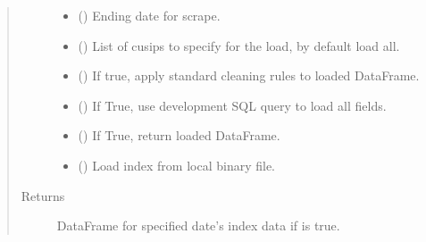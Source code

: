 \documentclass[letterpaper,10pt,english]{report}
\begin{document}
\begin{fulllineitems}
\begin{fulllineitems}
\begin{quote}
\begin{description}
\begin{itemize}
\item {} 
 (\sphinxstyleliteralemphasis{\sphinxupquote{, }}\sphinxstyleliteralemphasis{\sphinxupquote{, }}) \textendash{} Ending date for scrape.

\item {} 
 (\sphinxstyleliteralemphasis{\sphinxupquote{{[}}}\sphinxstyleliteralemphasis{\sphinxupquote{{]}}}\sphinxstyleliteralemphasis{\sphinxupquote{, }}) \textendash{} List of cusips to specify for the load, by default load all.

\item {} 
 (\sphinxstyleliteralemphasis{\sphinxupquote{, }}) \textendash{} If true, apply standard cleaning rules to loaded DataFrame.

\item {} 
 (\sphinxstyleliteralemphasis{\sphinxupquote{, }}) \textendash{} If True, use development SQL query to load all fields.

\item {} 
 (\sphinxstyleliteralemphasis{\sphinxupquote{, }}) \textendash{} If True, return loaded DataFrame.

\item {} 
 (\sphinxstyleliteralemphasis{\sphinxupquote{, }}) \textendash{} Load index from local binary file.

\end{itemize}

\item[{Returns}] \leavevmode
{} \textendash{} DataFrame for specified date’s index data if  is true.


\end{description}
\end{quote}
\end{fulllineitems}
\end{fulllineitems}
\end{document}
